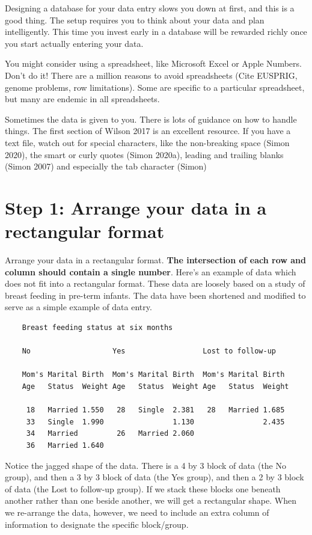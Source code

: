 \documentclass[
  letterpaper,
  DIV=11,
  numbers=noendperiod]{scrreprt}
\begin{document}
Designing a database for your data entry slows you down at first, and
this is a good thing. The setup requires you to think about your data
and plan intelligently. This time you invest early in a database will be
rewarded richly once you start actually entering your data.

You might consider using a spreadsheet, like Microsoft Excel or Apple
Numbers. Don't do it! There are a million reasons to avoid spreadsheets
(Cite EUSPRIG, genome problems, row limitations). Some are specific to a
particular spreadsheet, but many are endemic in all spreadsheets.

Sometimes the data is given to you. There is lots of guidance on how to
handle things. The first section of Wilson 2017 is an excellent
resource. If you have a text file, watch out for special characters,
like the non-breaking space (Simon 2020), the smart or curly quotes
(Simon 2020a), leading and trailing blanks (Simon 2007) and especially
the tab character (Simon)

\section{Step 1: Arrange your data in a rectangular
format}\label{step-1-arrange-your-data-in-a-rectangular-format}

Arrange your data in a rectangular format. \textbf{The intersection of
each row and column should contain a single number}. Here's an example
of data which does not fit into a rectangular format. These data are
loosely based on a study of breast feeding in pre-term infants. The data
have been shortened and modified to serve as a simple example of data
entry.

\begin{verbatim}
    Breast feeding status at six months

    No                   Yes                  Lost to follow-up

    Mom's Marital Birth  Mom's Marital Birth  Mom's Marital Birth
    Age   Status  Weight Age   Status  Weight Age   Status  Weight

     18   Married 1.550   28   Single  2.381   28   Married 1.685
     33   Single  1.990                1.130                2.435
     34   Married         26   Married 2.060
     36   Married 1.640
\end{verbatim}

Notice the jagged shape of the data. There is a 4 by 3 block of data
(the No group), and then a 3 by 3 block of data (the Yes group), and
then a 2 by 3 block of data (the Lost to follow-up group). If we stack
these blocks one beneath another rather than one beside another, we will
get a rectangular shape. When we re-arrange the data, however, we need
to include an extra column of information to designate the specific
block/group.
\end{document}
